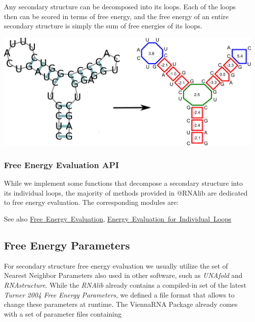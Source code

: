 Any secondary structure can be decomposed into its loops. Each of the loops then can be scored in terms of free energy, and the free energy of an entire secondary structure is simply the sum of free energies of its loops.

 
\begin{DoxyImageNoCaption}
  \mbox{\includegraphics[width=\textwidth,height=\textheight/2,keepaspectratio=true]{loop_decomposition}}
\end{DoxyImageNoCaption}
\hypertarget{energy_evaluation_sec_loop_decomposition_api}{}\subsubsection{Free Energy Evaluation A\+PI}\label{energy_evaluation_sec_loop_decomposition_api}
While we implement some functions that decompose a secondary structure into its individual loops, the majority of methods provided in @\+R\+N\+Alib are dedicated to free energy evaluation. The corresponding modules are\+:

\begin{DoxySeeAlso}{See also}
\mbox{\hyperlink{group__eval}{Free Energy Evaluation}}, \mbox{\hyperlink{group__eval__loops}{Energy Evaluation for Individual Loops}}
\end{DoxySeeAlso}
\hypertarget{energy_evaluation_sec_energy_parameters}{}\subsection{Free Energy Parameters}\label{energy_evaluation_sec_energy_parameters}
For secondary structure free energy evaluation we usually utilize the set of Nearest Neighbor Parameters also used in other software, such as {\itshape U\+N\+Afold} and {\itshape R\+N\+Astructure}. While the {\itshape R\+N\+Alib} already contains a compiled-\/in set of the latest {\itshape Turner 2004 Free Energy Parameters}, we defined a file format that allows to change these parameters at runtime. The {\ttfamily Vienna\+R\+NA Package} already comes with a set of parameter files containing


